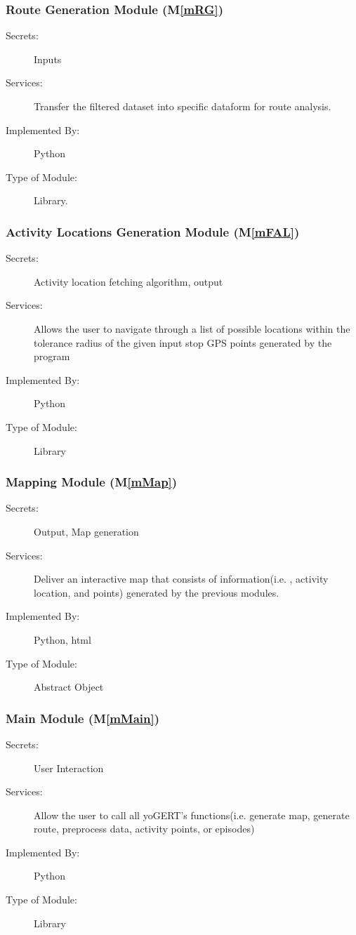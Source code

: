 \documentclass[12pt, titlepage]{article}
\newcommand{\mref}[1]{M\ref{#1}}
\begin{document}
\subsubsection{Route Generation Module (\mref{mRG})}
\begin{description}
\item[Secrets:]Inputs
\item[Services:]Transfer the filtered dataset into specific dataform for route analysis. 
\item[Implemented By:] Python
\item[Type of Module:] Library.
\end{description}

\subsubsection{Activity Locations Generation Module (\mref{mFAL})}
\begin{description}
\item[Secrets:]Activity location fetching algorithm, output
\item[Services:]Allows the user to navigate through a list of possible locations within the tolerance radius of the given input stop GPS points generated by the program
\item[Implemented By:] Python
\item[Type of Module:] Library
\end{description}

\subsubsection{Mapping Module (\mref{mMap})}
\begin{description}
\item[Secrets:]Output, Map generation
\item[Services:]Deliver an interactive map that consists of information(i.e. , activity location, and points) generated by the previous modules.
\item[Implemented By:] Python, html
\item[Type of Module:] Abstract Object
\end{description}

\subsubsection{Main Module (\mref{mMain})}
\begin{description}
\item[Secrets:]User Interaction
\item[Services:]Allow the user to call all yoGERT's functions(i.e. generate map, generate route, preprocess data, activity points, or episodes)
\item[Implemented By:] Python
\item[Type of Module:] Library
\end{description}
\end{document}
